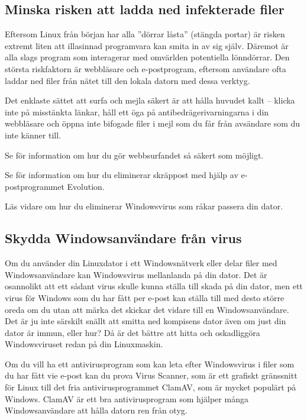 \documentclass[a4paper,final]{memoir} %
\begin{document}
\subsection{Minska risken att ladda ned infekterade filer}

Eftersom Linux från början har alla ''dörrar låsta'' (stängda portar) är risken extremt liten att illasinnad programvara kan smita in av sig själv. Däremot är alla slags program som interagerar med omvärlden potentiella lönndörrar. Den största riskfaktorn är webbläsare och e-postprogram, eftersom användare ofta laddar ned filer från nätet till den lokala datorn med dessa verktyg. 

Det enklaste sättet att surfa och mejla säkert är att hålla huvudet kallt -- klicka inte på misstänkta länkar, håll ett öga på antibedrägerivarningarna i din webbläsare och öppna inte bifogade filer i mejl som du får från avsändare som du inte känner till.

Se  för information om hur du gör webbsurfandet så säkert som möjligt.

Se  för information om hur du eliminerar skräppost med hjälp av e-postprogrammet Evolution.

Läs vidare om hur du eliminerar Windowsvirus som råkar passera din dator.

\subsection{Skydda Windowsanvändare från virus}


Om du använder din Linuxdator i ett Windowsnätverk eller delar filer med Windowsanvändare kan Windowsvirus mellanlanda på din dator. Det är osannolikt att ett sådant virus skulle kunna ställa till skada på din dator, men ett virus för Windows som du har fått per e-post kan ställa till med desto större oreda om du utan att märka det skickar det vidare till en Windowsanvändare. Det är ju inte särskilt snällt att smitta ned kompisens dator även om just din dator är immun, eller hur? Då är det bättre att hitta och oskadliggöra Windowsviruset redan på din Linuxmaskin.

Om du vill ha ett antivirusprogram som kan leta efter Windowsvirus i filer som du har fått vie e-post kan du prova Virus Scanner, som är ett grafiskt gränssnitt för Linux till det fria antivirusprogrammet ClamAV, som är mycket populärt på Windows. ClamAV är ett bra antivirusprogram som hjälper många Windowsanvändare att hålla datorn ren från otyg. 
\end{document}
